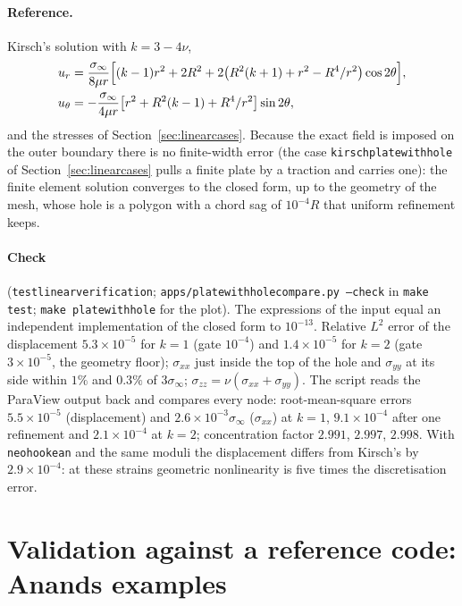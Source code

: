 \documentclass[11pt]{article}
\DeclareRobustCommand{\code}[1]{{\def\_{\textunderscore\allowbreak}\texttt{#1}}}
\DeclareRobustCommand{\file}[1]{{\def\_{\textunderscore\allowbreak}\texttt{#1}}}
\begin{document}
\paragraph{Reference.}
Kirsch's solution \cite{kirsch,timoshenko} with $k = 3 - 4\nu$,
\begin{align*}
  u_r &= \frac{\sigma_\infty}{8\mu r}\Bigl[(k-1)r^2 + 2R^2 + 2\bigl(R^2(k+1) + r^2 - R^4/r^2\bigr)\cos2\theta\Bigr], \\
  u_\theta &= -\frac{\sigma_\infty}{4\mu r}\bigl[r^2 + R^2(k-1) + R^4/r^2\bigr]\sin2\theta ,
\end{align*}
and the stresses of Section~\ref{sec:linearcases}.  Because the exact field
is imposed on the outer boundary there is no finite-width error (the case
\file{kirsch\_plate\_with\_hole} of Section~\ref{sec:linearcases} pulls a finite
plate by a traction and carries one): the finite element solution converges
to the closed form, up to the geometry of the mesh, whose hole is a polygon
with a chord sag of $10^{-4}R$ that uniform refinement keeps.

\paragraph{Check} (\file{test\_linear\_verification};
\file{apps/plate\_with\_hole\_compare.py --check} in \code{make test};
\code{make plate\_with\_hole} for the plot).
The expressions of the input equal an independent implementation of the
closed form to $10^{-13}$.  Relative $L^2$ error of the displacement
$5.3\times10^{-5}$ for $k = 1$ (gate $10^{-4}$) and $1.4\times10^{-5}$ for
$k = 2$ (gate $3\times10^{-5}$, the geometry floor); $\sigma_{xx}$ just
inside the top of the hole and $\sigma_{yy}$ at its side within $1\%$ and
$0.3\%$ of $3\sigma_\infty$; $\sigma_{zz} = \nu(\sigma_{xx} + \sigma_{yy})$.
The script reads the ParaView output back and compares every node:
root-mean-square errors $5.5\times10^{-5}$ (displacement) and
$2.6\times10^{-3}\sigma_\infty$ ($\sigma_{xx}$) at $k = 1$,
$9.1\times10^{-4}$ after one refinement and $2.1\times10^{-4}$ at $k = 2$;
concentration factor $2.991$, $2.997$, $2.998$.  With \code{neo\_hookean} and
the same moduli the displacement differs from Kirsch's by
$2.9\times10^{-4}$: at these strains geometric nonlinearity is five times
the discretisation error.

\section{Validation against a reference code: Anand\textquotesingle s examples}
\label{sec:anand}
\end{document}
